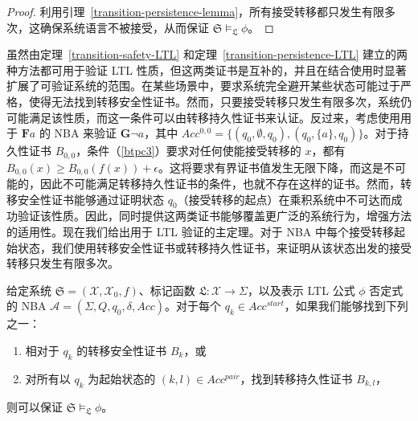 \begin{proof}
利用引理~\ref{transition-persistence-lemma}，所有接受转移都只发生有限多次，这确保系统语言不被接受，从而保证 $\mathfrak{S} \models_{\mathfrak{L}} \phi$。
\end{proof}

虽然由定理~\ref{transition-safety-LTL} 和定理~\ref{transition-persistence-LTL} 建立的两种方法都可用于验证 LTL 性质，但这两类证书是互补的，并且在结合使用时显著扩展了可验证系统的范围。在某些场景中，要求系统完全避开某些状态可能过于严格，使得无法找到转移安全性证书。然而，只要接受转移只发生有限多次，系统仍可能满足该性质，而这一条件可以由转移持久性证书来认证。反过来，考虑使用用于 $\mathbf{F} a$ 的 NBA 来验证 $\mathbf{G} \neg a$，其中 $Acc^{0,0} = \{(q_0, \emptyset, q_0), (q_0, \{a\}, q_0)\}$。对于持久性证书 $B_{0,0}$，条件（\ref{btpc3}）要求对任何使能接受转移的 $x$，都有 $B_{0,0}(x) \geq B_{0,0}(f(x)) + \epsilon$。这将要求有界证书值发生无限下降，而这是不可能的，因此不可能满足转移持久性证书的条件，也就不存在这样的证书。然而，转移安全性证书能够通过证明状态 $q_0$（接受转移的起点）在乘积系统中不可达而成功验证该性质。因此，同时提供这两类证书能够覆盖更广泛的系统行为，增强方法的适用性。现在我们给出用于 LTL 验证的主定理。对于 NBA 中每个接受转移起始状态，我们使用转移安全性证书或转移持久性证书，来证明从该状态出发的接受转移只发生有限多次。

\begin{theorem}[LTL 验证]
  \label{ltl-verification-theorem}
  给定系统 $\mathfrak{S} = (\mathcal{X}, \mathcal{X}_0, f)$、标记函数 $\mathfrak{L}: \mathcal{X} \rightarrow \Sigma$，以及表示 LTL 公式 $\phi$ 否定式的 NBA $\mathcal{A} = (\Sigma, Q, q_0, \delta, Acc)$。对于每个 $q_k \in Acc^{start}$，如果我们能够找到下列之一：
  \begin{enumerate}
    \item 相对于 $q_k$ 的转移安全性证书 $B_k$，或
    \item 对所有以 $q_k$ 为起始状态的 $(k, l) \in Acc^{pair}$，找到转移持久性证书 $B_{k,l}$，
  \end{enumerate}
  则可以保证 $\mathfrak{S} \models_{\mathfrak{L}} \phi$。
\end{theorem}

